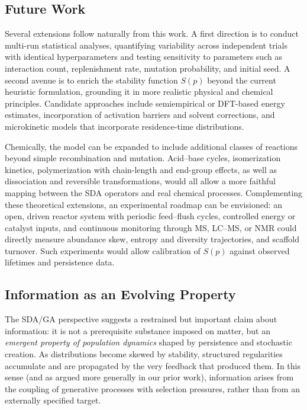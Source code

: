 \documentclass[life,article,submit,pdftex,moreauthors]{Definitions/mdpi}
\begin{document}
\subsection{Future Work}

Several extensions follow naturally from this work. A first direction is to conduct multi-run statistical analyses, quantifying variability across independent trials with identical hyperparameters and testing sensitivity to parameters such as interaction count, replenishment rate, mutation probability, and initial seed. A second avenue is to enrich the stability function $S(p)$ beyond the current heuristic formulation, grounding it in more realistic physical and chemical principles. Candidate approaches include semiempirical or DFT-based energy estimates, incorporation of activation barriers and solvent corrections, and microkinetic models that incorporate residence-time distributions.  

Chemically, the model can be expanded to include additional classes of reactions beyond simple recombination and mutation. Acid–base cycles, isomerization kinetics, polymerization with chain-length and end-group effects, as well as dissociation and reversible transformations, would all allow a more faithful mapping between the SDA operators and real chemical processes. Complementing these theoretical extensions, an experimental roadmap can be envisioned: an open, driven reactor system with periodic feed–flush cycles, controlled energy or catalyst inputs, and continuous monitoring through MS, LC–MS, or NMR could directly measure abundance skew, entropy and diversity trajectories, and scaffold turnover. Such experiments would allow calibration of $S(p)$ against observed lifetimes and persistence data.  


\subsection{Information as an Evolving Property}

The SDA/GA perspective suggests a restrained but important claim about information: it is not a prerequisite substance imposed on matter, but an \emph{emergent property of population dynamics} shaped by persistence and stochastic creation. As distributions become skewed by stability, structured regularities accumulate and are propagated by the very feedback that produced them. In this sense (and as argued more generally in our prior work), information arises from the coupling of generative processes with selection pressures, rather than from an externally specified target.
\end{document}
